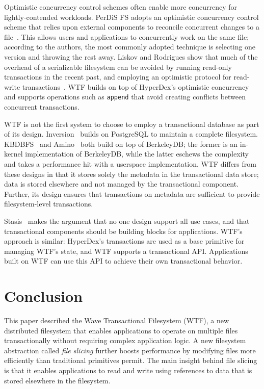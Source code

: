 \documentclass[twocolumn,10pt,letterpaper]{article}
\newcommand{\code}[1]{\texttt{#1}}
\begin{document}
Optimistic concurrency control schemes often enable more concurrency for
lightly-contended workloads.  PerDiS FS adopts an optimistic concurrency control
scheme that relies upon external components to reconcile concurrent changes to a
file~\cite{perdis}.  This allows users and applications to concurrently work on
the same file; according to the authors, the most commonly adopted technique is
selecting one version and throwing the rest away.  Liskov and Rodrigues show
that much of the overhead of a serializable filesystem can be avoided by running
read-only transactions in the recent past, and employing an optimistic protocol
for read-write transactions~\cite{liskovfast}.  WTF builds on top of HyperDex's
optimistic concurrency and supports operations such as \code{append} that avoid
creating conflicts between concurrent transactions.

WTF is not the first system to choose to employ a transactional database as part
of its design.  Inversion~\cite{inversion} builds on PostgreSQL to maintain a
complete filesystem.  KBDBFS~\cite{valor} and Amino~\cite{amino} both build on
top of BerkeleyDB; the former is an in-kernel implementation of BerkeleyDB,
while the latter eschews the complexity and takes a performance hit with a
userspace implementation.  WTF differs from these designs in that it stores
solely the metadata in the transactional data store; data is stored elsewhere
and not managed by the transactional component.  Further, its design ensures
that transactions on metadata are sufficient to provide filesystem-level
transactions.

Stasis~\cite{stasis} makes the argument that no one design support all use
cases, and that transactional components should be building blocks for
applications.  WTF's approach is similar:  HyperDex's transactions are used as a
base primitive for managing WTF's state, and WTF supports a transactional API.
Applications built on WTF can use this API to achieve their own transactional
behavior.

\section{Conclusion}

This paper described the Wave Transactional Filesystem (WTF), a new distributed
filesystem that enables applications to operate on multiple files
transactionally without requiring complex application logic.  A new filesystem
abstraction called {\em file slicing} further boosts performance by modifying
files more efficiently than traditional primitives permit.  The main insight
behind file slicing is that it enables applications to read and write using
references to data that is stored elsewhere in the filesystem.
\end{document}
